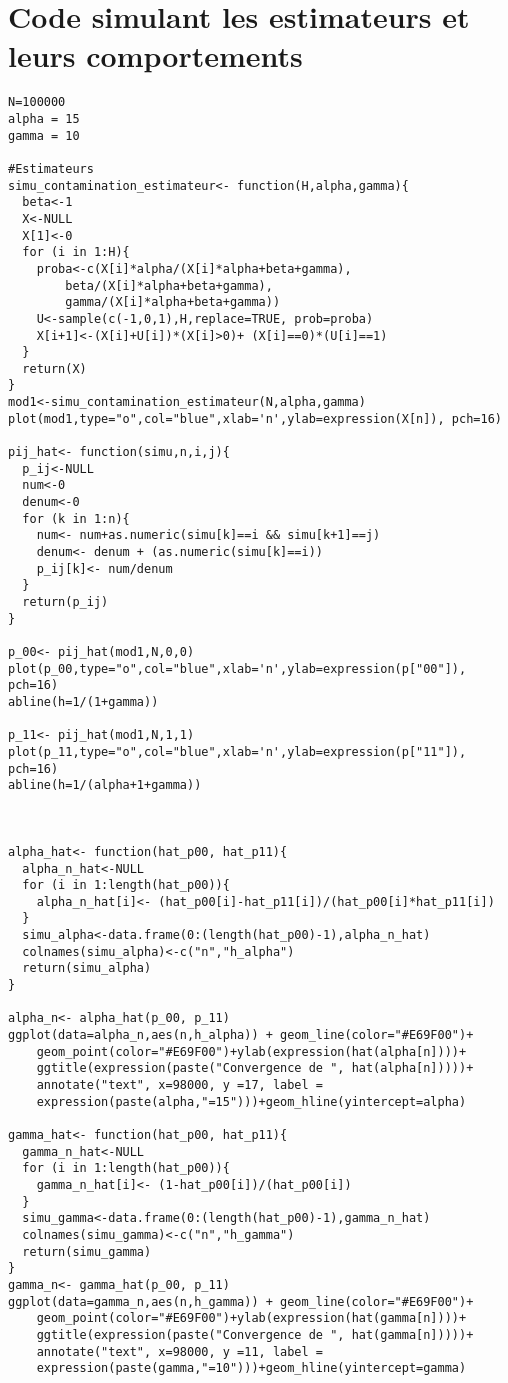 \documentclass[12pt,a4paper]{report}
\theoremstyle{remark}
\begin{document}
\section*{Code simulant les estimateurs et leurs comportements}
\begin{lstlisting}
N=100000
alpha = 15
gamma = 10

#Estimateurs
simu_contamination_estimateur<- function(H,alpha,gamma){
  beta<-1
  X<-NULL
  X[1]<-0
  for (i in 1:H){
    proba<-c(X[i]*alpha/(X[i]*alpha+beta+gamma),
        beta/(X[i]*alpha+beta+gamma),
        gamma/(X[i]*alpha+beta+gamma))
    U<-sample(c(-1,0,1),H,replace=TRUE, prob=proba)
    X[i+1]<-(X[i]+U[i])*(X[i]>0)+ (X[i]==0)*(U[i]==1)
  }
  return(X)
}
mod1<-simu_contamination_estimateur(N,alpha,gamma)
plot(mod1,type="o",col="blue",xlab='n',ylab=expression(X[n]), pch=16)

pij_hat<- function(simu,n,i,j){
  p_ij<-NULL
  num<-0
  denum<-0
  for (k in 1:n){
    num<- num+as.numeric(simu[k]==i && simu[k+1]==j)
    denum<- denum + (as.numeric(simu[k]==i))
    p_ij[k]<- num/denum
  }
  return(p_ij)
}

p_00<- pij_hat(mod1,N,0,0)
plot(p_00,type="o",col="blue",xlab='n',ylab=expression(p["00"]), pch=16)
abline(h=1/(1+gamma))

p_11<- pij_hat(mod1,N,1,1)
plot(p_11,type="o",col="blue",xlab='n',ylab=expression(p["11"]), pch=16)
abline(h=1/(alpha+1+gamma))



alpha_hat<- function(hat_p00, hat_p11){
  alpha_n_hat<-NULL
  for (i in 1:length(hat_p00)){
    alpha_n_hat[i]<- (hat_p00[i]-hat_p11[i])/(hat_p00[i]*hat_p11[i])
  }
  simu_alpha<-data.frame(0:(length(hat_p00)-1),alpha_n_hat)
  colnames(simu_alpha)<-c("n","h_alpha")
  return(simu_alpha)
}

alpha_n<- alpha_hat(p_00, p_11)
ggplot(data=alpha_n,aes(n,h_alpha)) + geom_line(color="#E69F00")+
    geom_point(color="#E69F00")+ylab(expression(hat(alpha[n])))+
    ggtitle(expression(paste("Convergence de ", hat(alpha[n]))))+
    annotate("text", x=98000, y =17, label =
    expression(paste(alpha,"=15")))+geom_hline(yintercept=alpha)

gamma_hat<- function(hat_p00, hat_p11){
  gamma_n_hat<-NULL
  for (i in 1:length(hat_p00)){
    gamma_n_hat[i]<- (1-hat_p00[i])/(hat_p00[i])
  }
  simu_gamma<-data.frame(0:(length(hat_p00)-1),gamma_n_hat)
  colnames(simu_gamma)<-c("n","h_gamma")
  return(simu_gamma)
}
gamma_n<- gamma_hat(p_00, p_11)
ggplot(data=gamma_n,aes(n,h_gamma)) + geom_line(color="#E69F00")+
    geom_point(color="#E69F00")+ylab(expression(hat(gamma[n])))+
    ggtitle(expression(paste("Convergence de ", hat(gamma[n]))))+
    annotate("text", x=98000, y =11, label =
    expression(paste(gamma,"=10")))+geom_hline(yintercept=gamma)



\end{lstlisting}
\end{document}
